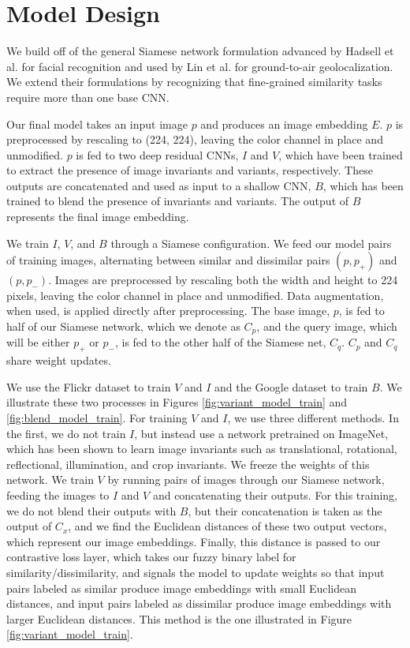 \section{Model Design}
We build off of the general Siamese network formulation advanced by Hadsell et al. for facial recognition and used by Lin et al. for ground-to-air geolocalization.\cite{hadsell2006dimensionality}\cite{lin2015learning} We extend their formulations by recognizing that fine-grained similarity tasks require more than one base CNN. 

Our final model takes an input image $p$ and produces an image embedding $E$. $p$ is  preprocessed by rescaling to (224, 224), leaving the color channel in place and unmodified. $p$ is fed to two deep residual CNNs, $I$ and $V$, which have been trained to extract the presence of image invariants and variants, respectively. These outputs are concatenated and used as input to a shallow CNN, $B$, which has been trained to blend the presence of invariants and variants. The output of $B$ represents the final image embedding.

We train $I$, $V$, and $B$ through a Siamese configuration. We feed our model pairs of training images, alternating between similar and dissimilar pairs $(p, p_+)$ and $(p, p_-)$. Images are preprocessed by rescaling both the width and height to 224 pixels, leaving the color channel in place and unmodified. Data augmentation, when used, is applied directly after preprocessing. The base image, $p$, is fed to half of our Siamese network, which we denote as $C_p$, and the query image, which will be either $p_+$ or $p_-$, is fed to the other half of the Siamese net, $C_q$. $C_p$ and $C_q$ share weight updates.

We use the Flickr dataset to train $V$ and $I$ and the Google dataset to train $B$. We illustrate these two processes in Figures \ref{fig:variant_model_train} and \ref{fig:blend_model_train}. For training $V$ and $I$, we use three different methods. In the first, we do not train $I$, but instead use a network pretrained on ImageNet, which has been shown to learn image invariants such as translational, rotational, reflectional, illumination, and crop invariants. We freeze the weights of this network. We train $V$ by running pairs of images through our Siamese network, feeding the images to $I$ and $V$ and concatenating their outputs. For this training, we do not blend their outputs with $B$, but their concatenation is taken as the output of $C_x$, and we find the Euclidean distances of these two output vectors, which represent our image embeddings. Finally, this distance is passed to our contrastive loss layer, which takes our fuzzy binary label for similarity/dissimilarity, and signals the model to update weights so that input pairs labeled as similar produce image embeddings with small Euclidean distances, and input pairs labeled as dissimilar produce image embeddings with larger Euclidean distances. This method is the one illustrated in Figure \ref{fig:variant_model_train}.

